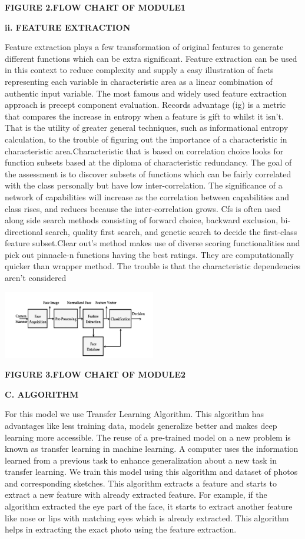 \documentclass[journal]{IEEEtran} %
\begin{document}
\textbf\textbf{{\textbf{FIGURE 2.FLOW CHART OF MODULE1}}
}


\vspace\textbf{\textbf{ii. FEATURE EXTRACTION}}

Feature extraction plays a few transformation of original features to generate different functions which can be extra significant. 
Feature extraction can be used in this context to reduce complexity and supply a easy illustration of facts representing each variable in characteristic area as a linear combination of authentic input variable. The most famous and widely used feature extraction approach is precept component evaluation.
Records advantage (ig) is a metric that compares the increase in entropy when a feature is gift to whilst it isn't. That is the utility of greater general techniques, such as informational entropy calculation, to the trouble of figuring out the importance of a characteristic in characteristic area.Characteristic that is based on correlation choice looks for function subsets based at the diploma of characteristic redundancy. The goal of the assessment is to discover subsets of functions which can be fairly correlated with the class personally but have low inter-correlation. The significance of a network of capabilities will increase as the correlation between capabilities and class rises, and reduces because the inter-correlation grows. Cfs is often used along side search methods consisting of forward choice, backward exclusion, bi-directional search, quality first search, and genetic search to decide the first-class feature subset.Clear out’s method makes use of diverse scoring functionalities and pick out pinnacle-n functions having the best ratings. They are computationally quicker than wrapper method. The trouble is that the characteristic dependencies aren't considered

\includegraphics[width=0.5\textwidth]{module2.PNG}

\textbf\textbf{{\textbf{FIGURE 3.FLOW CHART OF MODULE2}}
}

\textbf{C. ALGORITHM}

For this model we use Transfer Learning Algorithm. This algorithm has advantages like less training data, models generalize better and makes deep learning more accessible. The reuse of a pre-trained model on a new problem is known as transfer learning in machine learning. A computer uses the information learned from a previous task to enhance generalization about a new task in transfer learning. We train this model using this algorithm and dataset of photos and corresponding sketches. This algorithm extracts a feature and starts to extract a new feature with already extracted feature. For example, if the algorithm extracted the eye part of the face, it starts to extract another feature like nose or lips with matching eyes which is already extracted. This algorithm helps in extracting the exact photo using the feature extraction.
\end{document}
